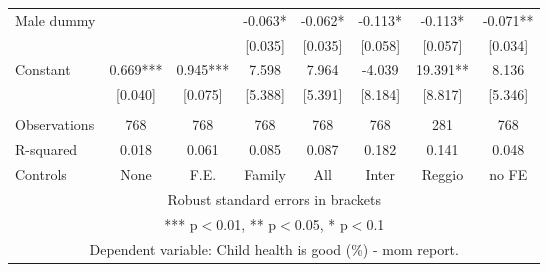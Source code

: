 \begin{tabular}{lccccccc}
Male dummy &  &  & -0.063* & -0.062* & -0.113* & -0.113* & -0.071** \\
 &  &  & [0.035] & [0.035] & [0.058] & [0.057] & [0.034] \\
Constant & 0.669*** & 0.945*** & 7.598 & 7.964 & -4.039 & 19.391** & 8.136 \\
 & [0.040] & [0.075] & [5.388] & [5.391] & [8.184] & [8.817] & [5.346] \\
 &  &  &  &  &  &  &  \\
Observations & 768 & 768 & 768 & 768 & 768 & 281 & 768 \\
R-squared & 0.018 & 0.061 & 0.085 & 0.087 & 0.182 & 0.141 & 0.048 \\
 Controls & None & F.E. & Family & All & Inter & Reggio & no FE \\ \hline
\multicolumn{8}{c}{ Robust standard errors in brackets} \\
\multicolumn{8}{c}{ *** p$<$0.01, ** p$<$0.05, * p$<$0.1} \\
\multicolumn{8}{c}{ Dependent variable: Child health is good (\%) - mom report.} \\
\end{tabular}
